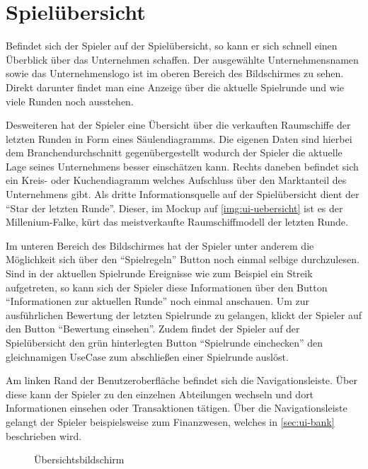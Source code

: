 \section{Spielübersicht}
\label{sec:ui-uebersicht}


Befindet sich der Spieler auf der Spielübersicht, so kann er sich schnell einen Überblick über das Unternehmen schaffen. Der ausgewählte Unternehmensnamen sowie das Unternehmenslogo ist im oberen Bereich des Bildschirmes zu sehen. Direkt darunter findet man eine Anzeige über die aktuelle Spielrunde und wie viele Runden noch ausstehen. 

Desweiteren hat der Spieler eine Übersicht über die verkauften Raumschiffe der letzten Runden in Form eines Säulendiagramms. Die eigenen Daten sind hierbei dem Branchendurchschnitt gegenübergestellt wodurch der Spieler die aktuelle Lage seines Unternehmens besser einschätzen kann. Rechts daneben befindet sich ein Kreis- oder Kuchendiagramm welches Aufschluss über den Marktanteil des Unternehmens gibt. Als dritte Informationsquelle auf der Spielübersicht dient der “Star der letzten Runde”. Dieser, im Mockup auf \vref{img:ui-uebersicht} ist es der Millenium-Falke, kürt das meistverkaufte Raumschiffmodell der letzten Runde. 

Im unteren Bereich des Bildschirmes hat der Spieler unter anderem die Möglichkeit sich über den “Spielregeln” Button noch einmal selbige durchzulesen. Sind in der aktuellen Spielrunde Ereignisse wie zum Beispiel ein Streik aufgetreten, so kann sich der Spieler diese Informationen über den Button “Informationen zur aktuellen Runde” noch einmal anschauen. Um zur ausführlichen Bewertung der letzten Spielrunde zu gelangen, klickt der Spieler auf den Button “Bewertung einsehen”. Zudem findet der Spieler auf der Spielübersicht den grün hinterlegten Button “Spielrunde einchecken” den gleichnamigen UseCase zum abschließen einer Spielrunde auslöst. 

Am linken Rand der Benutzeroberfläche befindet sich die Navigationsleiste. Über diese kann der Spieler zu den einzelnen Abteilungen wechseln und dort Informationen einsehen oder Transaktionen tätigen. Über die Navigationsleiste gelangt der Spieler beispielsweise zum Finanzwesen, welches in \ref{sec:ui-bank} beschrieben wird. 

\begin{figure}[htb]
  \centering
  \caption{Übersichtsbildschirm}
  \label{img:ui-uebersicht}
\end{figure}

\autorende{}